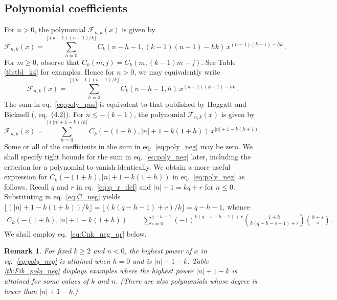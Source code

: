 \documentclass[review]{elsarticle}
\theoremstyle{plain}
\newtheorem{remark}[theorem]{Remark}
\begin{document}
\subsection{Polynomial coefficients}\label{sec:poly_coeff}
For $n>0$, the polynomial $\mathcal{F}_{n,k}(x)$ is given by
\begin{equation}
\label{eq:poly_pos1}
\mathcal{F}_{n,k}(x) = \sum_{h=0}^{\lfloor(k-1)(n-1)/k\rfloor} C_k(n-h-1, (k-1)(n-1)-hk)\,x^{(n-1)(k-1)-hk} \,.
\end{equation}
For $m\ge0$, observe that $C_k(m,j) = C_k(m, (k-1)m-j)$.
See Table \ref{tb:tbl_k4} for examples.
Hence for $n>0$, we may equivalently write
\begin{equation}
\label{eq:poly_pos}
\mathcal{F}_{n,k}(x) = \sum_{h=0}^{\lfloor(k-1)(n-1)/k\rfloor} C_k(n-h-1, h)\,x^{(n-1)(k-1)-hk} \,.
\end{equation}
The sum in eq.~\eqref{eq:poly_pos} is equivalent to that published by Hoggatt and Bicknell (\cite{HoggattBicknell_FibGen}, eq.~(4.2)).
For $n\le-(k-1)$, the polynomial $\mathcal{F}_{n,k}(x)$ is given by
\begin{equation}
\label{eq:poly_neg}
\mathcal{F}_{n,k}(x) = \sum_{h=0}^{\lfloor(|n|+1-k)/k\rfloor} C_k(-(1+h), |n|+1-k(1+h))\,x^{|n|+1-k(h+1)} \,.
\end{equation}
Some or all of the coefficients in the sum in eq.~\eqref{eq:poly_neg} may be zero.
We shall specify tight bounds for the sum in eq.~\eqref{eq:poly_neg} later,
including the criterion for a polynomial to vanish identically.
We obtain a more useful expression for $C_k(-(1+h),|n|+1-k(1+h))$ in eq.~\eqref{eq:poly_neg} as follows.
Recall $q$ and $r$ in eq.~\eqref{eq:q_r_def} and $|n|+1=kq+r$ for $n\le0$.
Substituting in eq.~\eqref{eq:C_neg} yields $\lfloor (|n|+1-k(1+h))/k \rfloor = \lfloor (k(q-h-1)+r)/k \rfloor = q-h-1$, whence
\begin{equation}
\label{eq:Cnk_neg_qr}    
\begin{split}
  C_k(-(1+h),|n|+1-k(1+h)) &= \sum_{s=0}^{q-h-1} (-1)^{k(q-s-h-1)+r} 
  \binom{1+h}{k(q-h-s-1)+r} \binom{h+s}{s} \,.
\end{split}
\end{equation}
We shall employ eq.~\eqref{eq:Cnk_neg_qr} below.
\begin{remark}\label{rem:high_power_neg}
For fixed $k\ge2$ and $n<0$, the highest power of $x$ in eq.~\eqref{eq:poly_neg} is attained when $h=0$ and is $|n|+1-k$.
Table \ref{tb:Fib_poly_neg} displays examples where the highest power $|n|+1-k$ is attained for some values of $k$ and $n$.
(There are also polynomials whose degree is lower than $|n|+1-k$.)
\end{remark}
\end{document}
